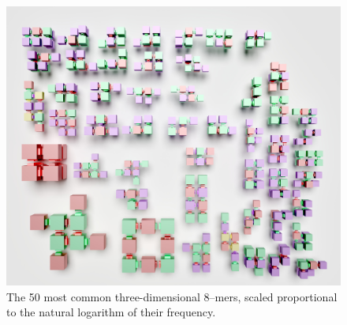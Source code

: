 \begin{figure}[h]
    \centering
    \includegraphics[width=\textwidth]{figures/8-mers_3d.jpg}
    \caption{The 50 most common three-dimensional 8--mers, scaled proportional to the natural logarithm of their frequency.}
    \label{fig:8-mer_3d_zoo}
\end{figure}




